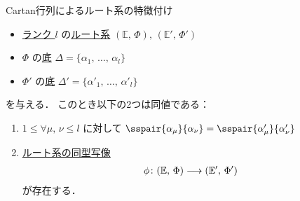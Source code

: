 \documentclass[rep_main]{subfiles}
\begin{document}
\begin{myprop}[label=prop:Cartan-matrix-basic]{Cartan行列によるルート系の特徴付け}
	\begin{itemize}
		\item \hyperref[def:rank-root]{ランク $l$} の\hyperref[ax:root-system]{ルート系} $(\mathbb{E},\, \Phi),\, (\mathbb{E}',\, \Phi')$ 
		\item $\Phi$ の\hyperref[def:base-root]{底} $\Delta = \{\alpha_1,\, \dots,\, \alpha_l\}$
		\item $\Phi'$ の\hyperref[def:base-root]{底} $\Delta' = \{\alpha'_1,\, \dots,\, \alpha'_l\}$
	\end{itemize}
	を与える．
	このとき以下の2つは同値である：
	\begin{enumerate}
		\item $1 \le \forall \mu,\, \nu \le l$ に対して $\sspair{\alpha_\mu}{\alpha_\nu} = \sspair{\alpha'_\mu}{\alpha'_\nu}$
		\item \hyperref[def:isom-root]{ルート系の同型写像}
			\begin{align}
				\phi \colon (\mathbb{E},\, \Phi) \longrightarrow (\mathbb{E}',\, \Phi')
			\end{align}
			が存在する．
	\end{enumerate}
\end{myprop}
\end{document}
